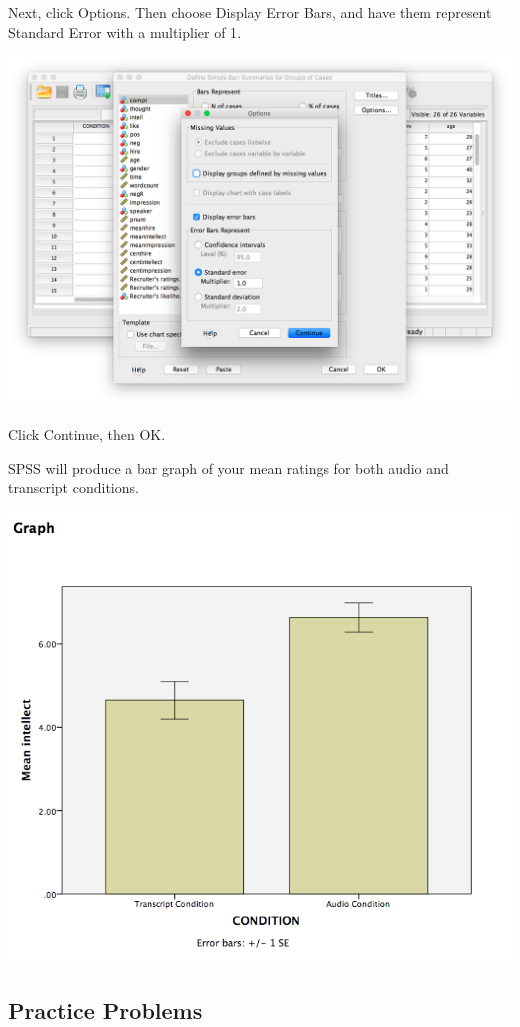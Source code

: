 \documentclass[
]{book}
\begin{document}
Next, click {Options}. Then choose {Display Error Bars}, and have them represent {Standard Error} with a {multiplier of 1}.

\includegraphics{img/7.4.21.png}

Click {Continue}, then {OK}.

SPSS will produce a bar graph of your mean ratings for both audio and transcript conditions.

\includegraphics{img/7.4.22.png}

\hypertarget{practice-problems-6}{%
\subsection{Practice Problems}\label{practice-problems-6}}
\end{document}
